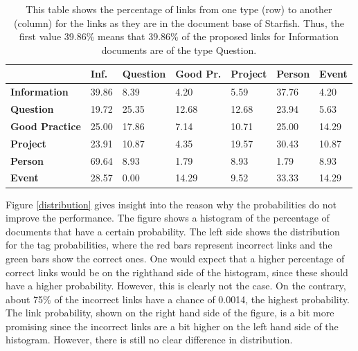 \begin{table}
\begin{tabular}{| l | l | l | l | l | l | l | }
\hline
 & {\bf Inf. }& {\bf Question }& {\bf Good Pr.} & {\bf Project }&{\bf Person }& {\bf Event} \\
\hline
{\bf Information} &  39.86 & 8.39 &4.20 &5.59 &37.76 &4.20\\
{\bf Question} & 19.72 &25.35 &12.68 &12.68 &23.94 &5.63\\
{\bf Good Practice} & 25.00 & 17.86 & 7.14 & 10.71 & 25.00 & 14.29 \\
{\bf Project } & 23.91 & 10.87 & 4.35 & 19.57 & 30.43 & 10.87 \\
{\bf Person} & 69.64 & 8.93 & 1.79 & 8.93 & 1.79 & 8.93 \\
{\bf Event }& 28.57 & 0.00 & 14.29 & 9.52 & 33.33 & 14.29\\
\hline
\end{tabular}
\caption{This table shows the percentage of links from one type (row) to another (column) for the links as they are in the document base of Starfish. Thus, the first value 39.86\% means that 39.86\% of the proposed links for Information documents are of the type Question.}
\label{bayes_table3}
\end{table}

Figure \ref{distribution} gives insight into the reason why the probabilities
do not improve the performance. The figure shows a histogram of the percentage
of documents that have a certain probability. The left side shows the
distribution for the tag probabilities, where the red bars represent incorrect
links and the green bars show the correct ones. One would expect that a higher
percentage of correct links would be on the righthand side of the histogram,
since these should have a higher probability. However, this is clearly not the
case. On the contrary, about 75\% of the incorrect links have a chance of
0.0014, the highest probability. The link probability, shown on the right hand
side of the figure, is a bit more promising since the incorrect links are a bit
higher on the left hand side of the histogram. However, there is still no clear
difference in distribution. 

